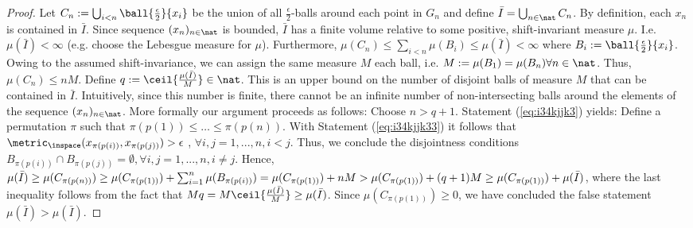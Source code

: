 \begin{lem}
\begin{proof}
Let $C_n := \bigcup_{i < n} \ball{\frac \epsilon 2}{x_i} $ be the union of all $\frac \epsilon 2$-balls around each point in $G_n$ and define $\bar I = \bigcup_{n \in \nat} C_n$.
By definition, each $x_n$ is contained in $\bar I$.
Since sequence $(x_n)_{n \in \nat}$ is bounded, $\bar I $ has a finite volume relative to some positive, shift-invariant measure $\mu$. I.e. $\mu(\bar I) < \infty$ (e.g. choose the Lebesgue measure for $\mu$). Furthermore, $\mu(C_n) \leq \sum_{i <n} \mu(B_i) \leq \mu(\bar I)< \infty$ where $B_i := \ball{\frac \epsilon 2}{x_i}$. Owing to the assumed shift-invariance, we can assign the same measure $M$ each ball, i.e. $M:=\mu(B_1) = \mu(B_n)\forall n \in \nat$. Thus, $\mu(C_n) \leq n M$.
Define $q:= \ceil{\frac{\mu(\bar I)}{M}} \in \nat$. This is an upper bound on the number of disjoint balls of measure $M$  that can be contained in $\bar I$. Intuitively, since this number is finite, there cannot be an infinite number of non-intersecting balls around the elements of the sequence $(x_n)_{n \in \nat}$. More formally our argument proceeds as follows:
Choose $n > q+1$. Statement (\ref{eq:i34kjjk3}) yields:
  Define a permutation $\pi$ such that $\pi(p(1)) \leq \ldots \leq \pi(p(n))$. 
With Statement (\ref{eq:i34kjjk33}) it follows that \\
${\metric_\inspace(x_{\pi(p(i))},x_{\pi(p(j))}) > \epsilon}$ , $\forall i,j =1,...,n, i < j$. Thus, we conclude the disjointness conditions $B_{\pi(p(i))} \cap B_{\pi(p(j))} = \emptyset , \forall i,j =1,...,n, i \neq j$. 
Hence,  $\mu(\bar I) \geq \mu(C_{\pi(p(n))}) \geq \mu(C_{\pi(p(1))}) + \sum_{i=1}^n \mu(B_{\pi(p(i))}) \newline = \mu(C_{\pi(p(1))}) +  n M > \mu(C_{\pi(p(1))}) + (q+1) M \geq\mu(C_{\pi(p(1))}) + \mu(\bar I)$, where the last inequality follows from the fact that  $M q= M \ceil{\frac{\mu(\bar I)}{M}} \geq \mu(\bar I)$. Since $\mu(C_{\pi(p(1))}) \geq 0$, we have concluded the false statement $\mu(\bar I) > \mu(\bar I)$.

\end{proof}
\label{lem:bndseq_entails_distgridvanish}
\end{lem}  


